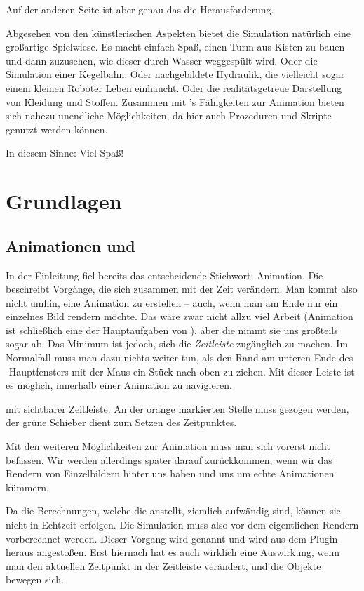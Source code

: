 \documentclass[10pt,DIV=14,a4paper]{scrartcl}
\begin{document}
Auf der anderen Seite ist aber genau das die Herausforderung.

Abgesehen von den künstlerischen Aspekten bietet die Simulation
natürlich eine großartige Spielwiese. Es macht einfach Spaß, einen Turm
aus Kisten zu bauen und dann zuzusehen, wie dieser durch Wasser
weggespült wird. Oder die Simulation einer Kegelbahn. Oder nachgebildete
Hydraulik, die vielleicht sogar einem kleinen Roboter Leben einhaucht.
Oder die realitätsgetreue Darstellung von Kleidung und Stoffen.
Zusammen mit \aoi's Fähigkeiten zur Animation bieten sich nahezu
unendliche Möglichkeiten, da hier auch Prozeduren und Skripte genutzt
werden können.

In diesem Sinne: Viel Spaß!



\pagebreak
\section{Grundlagen}

\subsection{Animationen und }
In der Einleitung fiel bereits das entscheidende Stichwort: Animation.
Die \fluidsim beschreibt Vorgänge, die sich zusammen mit der Zeit
verändern. Man kommt also nicht umhin, eine Animation zu erstellen --
auch, wenn man am Ende nur ein einzelnes Bild rendern möchte. Das wäre
zwar nicht allzu viel Arbeit (Animation ist schließlich eine der
Hauptaufgaben von \aoi), aber die \fluidsim nimmt sie uns großteils
sogar ab. Das Minimum ist jedoch, sich die \emph{Zeitleiste} zugänglich
zu machen. Im Normalfall muss man dazu nichts weiter tun, als den Rand
am unteren Ende des \aoi-Hauptfensters mit der Maus ein Stück nach oben
zu ziehen. Mit dieser Leiste ist es möglich, innerhalb einer Animation
zu navigieren.

{\aoi mit sichtbarer Zeitleiste. An der orange markierten Stelle muss
gezogen werden, der grüne Schieber dient zum Setzen des Zeitpunktes.}

Mit den weiteren Möglichkeiten zur Animation muss man sich vorerst nicht
befassen. Wir werden allerdings später darauf zurückkommen, wenn wir das
Rendern von Einzelbildern hinter uns haben und uns um echte Animationen
kümmern.

Da die Berechnungen, welche die \fluidsim anstellt, ziemlich aufwändig
sind, können sie nicht in Echtzeit erfolgen. Die Simulation muss also
vor dem eigentlichen Rendern vorberechnet werden. Dieser Vorgang wird
 genannt und wird aus dem Plugin heraus angestoßen. Erst
hiernach hat es auch wirklich eine Auswirkung, wenn man den aktuellen
Zeitpunkt in der Zeitleiste verändert, und die Objekte bewegen sich.
\end{document}
